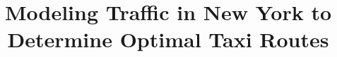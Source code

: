 \documentclass{sig-alternate}
\begin{document}
%

\title{Modeling Traffic in New York to Determine Optimal Taxi Routes}
%
%
%
%
%
\end{document}
